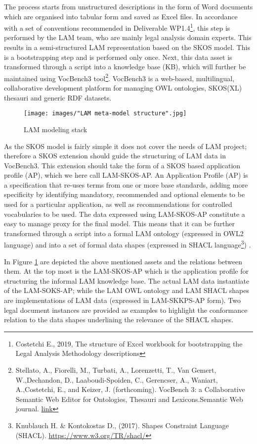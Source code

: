 The process starts from unstructured descriptions in the form of Word
documents which are organised into tabular form and saved as Excel
files. In accordance with a set of conventions recommended in Deliverable WP1.4\footnote{Costetchi E., 2019, The structure of Excel workbook for
	bootstrapping the Legal Analysis Methodology descriptions}, this step is performed by the LAM team, who are mainly legal analysis domain experts. 
This results in a semi-structured LAM representation based on the SKOS model. This is a bootstrapping step and is performed only once.
Next, this data asset is transformed through a script into a knowledge
base (KB), which will further be maintained using VocBench3
tool\footnote{Stellato, A., Fiorelli,
	M., Turbati, A., Lorenzetti, T., Van Gemert, W.,Dechandon, D., Laaboudi-Spoiden, C., Gerencser, A., Waniart, A.,Costetchi, E., and Keizer, J. (forthcoming). VocBench 3: a Collaborative Semantic Web Editor for Ontologies, Thesauri and Lexicons.Semantic Web journal. \href{http://www.semantic-web-journal.net/content/vocbench-3-collaborative-semantic-web-editor-ontologies-thesauri-and-lexicons-1}{link}}. VocBench3 is a
web-based, multilingual, collaborative development platform for managing
OWL ontologies, SKOS(XL) thesauri and generic RDF datasets.

\begin{figure}[!ht]
	\centering
	\texttt{[image: images/"LAM meta-model structure".jpg]}
	\caption{LAM modeling stack}
	\label{fig:meta-model}
\end{figure}

As the SKOS model is fairly simple it does not cover the needs of LAM
project; therefore a SKOS extension should guide the structuring of LAM
data in VocBench3. This extension should take the form of a SKOS based
application profile (AP), which we here call LAM-SKOS-AP. An Application
Profile (AP) is a specification that re-uses terms from one or more base
standards, adding more specificity by identifying mandatory, recommended
and optional elements to be used for a particular application, as well
as recommendations for controlled vocabularies to be used. The data
expressed using LAM-SKOS-AP constitute a easy to manage proxy for the
final model. This means that it can be further transformed through a
script into a formal LAM ontology (expressed in OWL2 language) and into
a set of formal data shapes (expressed in SHACL
language\footnote{Knublauch H. \& Kontokostas D., (2017). Shapes Constraint Language (SHACL). \url{https://www.w3.org/TR/shacl/}}) .

In Figure \ref{fig:meta-model} are depicted the above mentioned assets and the
relations between them. At the top most is the LAM-SKOS-AP which is the
application profile for structuring the informal LAM knowledge base. The
actual LAM data instantiate of the LAM-SOKS-AP; while the LAM OWL
ontology and LAM SHACL shapes are implementations of LAM data (expressed
in LAM-SKKPS-AP form). Two legal document instances are provided as
examples to highlight the conformance relation to the data shapes
underlining the relevance of the SHACL shapes.

